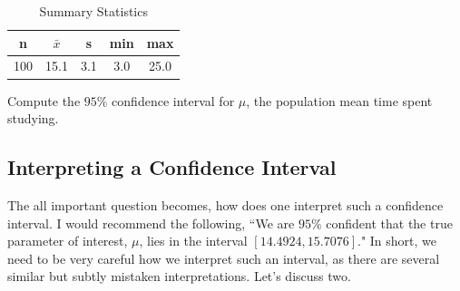 \documentclass[11pt]{article}
\begin{document}
\begin{table}[ht]
    \centering
    \begin{tabular}{ccccc}
        \toprule
        n & $\bar{x}$ & s & min & max \\
        \midrule
        100 & 15.1 & 3.1 & 3.0 & 25.0 \\
        \bottomrule
    \end{tabular}
    \caption{Summary Statistics}
    \label{tab:summary}
\end{table}
Compute the $95\%$ confidence interval for $\mu$, the population mean time spent studying.\\ 
 \textit{}

\subsection{Interpreting a Confidence Interval} 

The all important question becomes, how does one interpret such a confidence interval.  I would recommend the following, ``We are $95\%$ confident that the true parameter of interest, $\mu$, lies in the interval $[14.4924, 15.7076]$."  In short, we need to be very careful how we interpret such an interval, as there are several similar but subtly mistaken interpretations.  Let's discuss two.  
\end{document}
